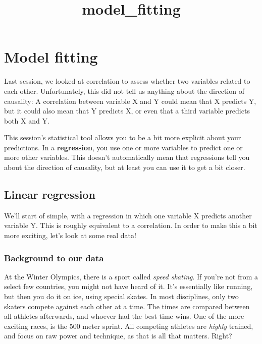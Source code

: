 \documentclass[11pt]{article}
\title{model\_fitting}
\begin{document}
    
    
    \maketitle
    
    

    
    \section{Model fitting}\label{model-fitting}

Last session, we looked at correlation to assess whether two variables
related to each other. Unfortunately, this did not tell us anything
about the direction of causality: A correlation between variable X and Y
could mean that X predicts Y, but it could also mean that Y predicts X,
or even that a third variable predicts both X and Y.

This session's statistical tool allows you to be a bit more explicit
about your predictions. In a \textbf{regression}, you use one or more
variables to predict one or more other variables. This doesn't
automatically mean that regressions tell you about the direction of
causality, but at least you can use it to get a bit closer.

    \subsection{Linear regression}\label{linear-regression}

We'll start of simple, with a regression in which one variable X
predicts another variable Y. This is roughly equivalent to a
correlation. In order to make this a bit more exciting, let's look at
some real data!

\subsubsection{Background to our data}\label{background-to-our-data}

At the Winter Olympics, there is a sport called \emph{speed skating}. If
you're not from a select few countries, you might not have heard of it.
It's essentially like running, but then you do it on ice, using special
skates. In most disciplines, only two skaters compete against each other
at a time. The times are compared between all athletes afterwards, and
whoever had the best time wins. One of the more exciting races, is the
500 meter sprint. All competing athletes are \emph{highly} trained, and
focus on raw power and technique, as that is all that matters. Right?
\end{document}
